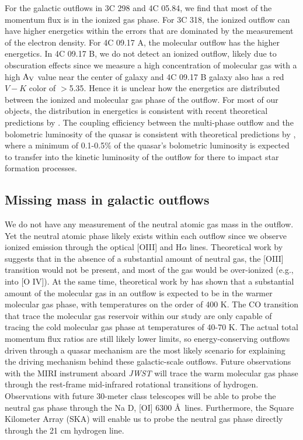 \documentclass[twocolumn]{aastex63}
\newcommand{\ha}{H$\alpha$\xspace}
\newcommand{\oiii}{[O{\sc III}]\xspace}
\begin{document}
For the galactic outflows in 3C 298 and 4C 05.84, we find that most of the momentum flux is in the ionized gas phase. For 3C 318, the ionized outflow can have higher energetics within the errors that are dominated by the measurement of the electron density. For 4C 09.17 A, the molecular outflow has the higher energetics. In 4C 09.17 B, we do not detect an ionized outflow, likely due to obscuration effects since we measure a high concentration of molecular gas with a high $\rm A_{V}$ value near the center of galaxy and 4C 09.17 B galaxy also has a red $V-K$ color of $>$5.35. Hence it is unclear how the energetics are distributed between the ionized and molecular gas phase of the outflow. For most of our objects, the distribution in energetics is consistent with recent theoretical predictions by \citet{Richings20}. The coupling efficiency between the multi-phase outflow and the bolometric luminosity of the quasar is consistent with theoretical predictions by \citet{Hopkins10,Choi12,Costa18}, where a minimum of 0.1-0.5$\%$ of the quasar's bolometric luminosity is expected to transfer into the kinetic luminosity of the outflow for there to impact star formation processes.

\subsection{Missing mass in galactic outflows}

We do not have any measurement of the neutral atomic gas mass in the outflow. Yet the neutral atomic phase likely exists within each outflow since we observe ionized emission through the optical \oiii and \ha lines. Theoretical work by \citet{Dempsey18} suggests that in the absence of a substantial amount of neutral gas, the \oiii transition would not be present, and most of the gas would be over-ionized (e.g., into [O IV]). At the same time, theoretical work by \citet{Richings18} has shown that a substantial amount of the molecular gas in an outflow is expected to be in the warmer molecular gas phase, with temperatures on the order of 400 K. The CO transition that trace the molecular gas reservoir within our study are only capable of tracing the cold molecular gas phase at temperatures of 40-70 K. The actual total momentum flux ratios are still likely lower limits, so energy-conserving outflows driven through a quasar mechanism are the most likely scenario for explaining the driving mechanism behind these galactic-scale outflows. Future observations with the MIRI instrument aboard \textit{JWST} will trace the warm molecular gas phase through the rest-frame mid-infrared rotational transitions of hydrogen. Observations with future 30-meter class telescopes will be able to probe the neutral gas phase through the Na D, [OI] 6300 \AA\ lines. Furthermore, the Square Kilometer Array (SKA) will enable us to probe the neutral gas phase directly through the 21 cm hydrogen line. 
\end{document}
